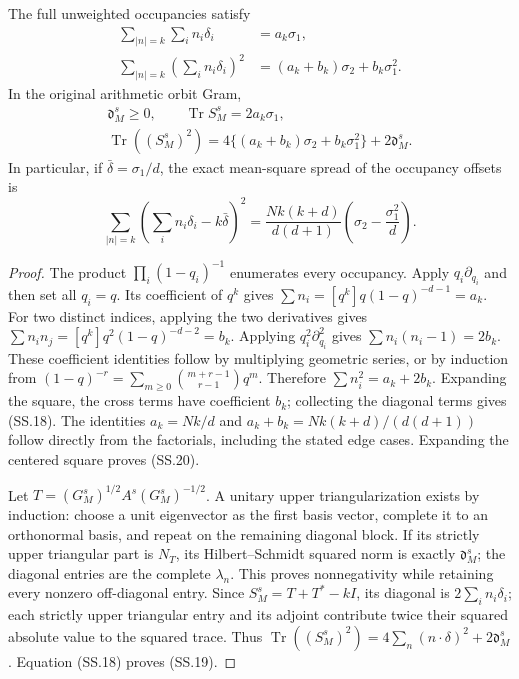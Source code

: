 \begin{theorem}
The full unweighted occupancies satisfy
\[
 \begin{split}
 \sum_{|n|=k}\sum_i n_i\delta_i&=a_k\sigma_1,\\
 \sum_{|n|=k}\left(\sum_i n_i\delta_i\right)^2
     &=(a_k+b_k)\sigma_2+b_k\sigma_1^2.
 \end{split}                                                  \tag{SS.18}
\]
In the original arithmetic orbit Gram,
\[
 \begin{gathered}
 \mathfrak d_M^s\ge0,\qquad
 \operatorname{Tr}S_M^s=2a_k\sigma_1,\\
 \operatorname{Tr}((S_M^s)^2)
     =4\{(a_k+b_k)\sigma_2+b_k\sigma_1^2\}
                                           +2\mathfrak d_M^s.
 \end{gathered}                                                \tag{SS.19}
\]
In particular, if \(\bar\delta=\sigma_1/d\), the exact
mean-square spread of the occupancy offsets is
\[
 \sum_{|n|=k}\left(\sum_i n_i\delta_i-k\bar\delta\right)^2
 =\frac{Nk(k+d)}{d(d+1)}
                        \left(\sigma_2-\frac{\sigma_1^2}{d}\right).
                                                               \tag{SS.20}
\]
\end{theorem}
\begin{proof}
The product \(\prod_i(1-q_i)^{-1}\) enumerates every occupancy.
Apply \(q_i\partial_{q_i}\) and then set all \(q_i=q\).
Its coefficient of \(q^k\) gives
\(\sum n_i=[q^k]q(1-q)^{-d-1}=a_k\).
For two distinct indices, applying the two derivatives gives
\(\sum n_i n_j=[q^k]q^2(1-q)^{-d-2}=b_k\).
Applying \(q_i^2\partial_{q_i}^2\) gives
\(\sum n_i(n_i-1)=2b_k\).  These coefficient identities follow
by multiplying geometric series, or by induction from
\((1-q)^{-r}=\sum_{m\ge0}\binom{m+r-1}{r-1}q^m\).
Therefore \(\sum n_i^2=a_k+2b_k\).  Expanding the square,
the cross terms have coefficient \(b_k\); collecting the diagonal
terms gives (SS.18).  The identities
\(a_k=Nk/d\) and \(a_k+b_k=Nk(k+d)/(d(d+1))\)
follow directly from the factorials, including the stated edge cases.
Expanding the centered square proves (SS.20).

Let \(T=(G_M^s)^{1/2}A^s(G_M^s)^{-1/2}\).  A unitary
upper triangularization exists by induction: choose a unit
eigenvector as the first basis vector, complete it to an orthonormal
basis, and repeat on the remaining diagonal block.  If its strictly
upper triangular part is \(N_T\), its Hilbert--Schmidt squared
norm is exactly \(\mathfrak d_M^s\); the diagonal entries are
the complete \(\lambda_n\).  This proves nonnegativity while
retaining every nonzero off-diagonal entry.  Since
\(S_M^s=T+T^*-kI\), its diagonal is
\(2\sum_i n_i\delta_i\); each strictly upper triangular
entry and its adjoint contribute twice their squared absolute value
to the squared trace.  Thus
\(\operatorname{Tr}((S_M^s)^2)=4\sum_n(n\cdot\delta)^2
+2\mathfrak d_M^s\).  Equation (SS.18) proves (SS.19).
\end{proof}

